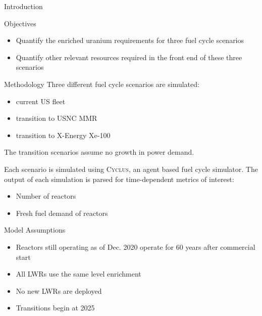 \documentclass[final]{beamer}
\newlength{\onecolwid}
\newlength{\threecolwid}
\newcommand{\Cyclus}{\textsc{Cyclus}\xspace}%
\begin{document}
\begin{frame}[t]
\begin{columns}[t,totalwidth=\threecolwid]
\begin{column}{\onecolwid}
\begin{block}{Introduction}
\end{block}

\begin{alertblock}{Objectives}
\begin{itemize}
    \item Quantify the enriched uranium requirements for three fuel cycle 
		  scenarios
	\item Quantify other relevant resources required in the front end of 
		  these three scenarios
\end{itemize}

\end{alertblock}

\begin{block}{Methodology}
Three different fuel cycle scenarios are simulated:
  \begin{itemize}
    \item current US fleet
    \item transition to \gls{USNC} \gls{MMR}
    \item transition to X-Energy Xe-100
  \end{itemize}
The transition scenarios assume no growth in power demand.


Each scenario is simulated using \Cyclus \cite{huff_fundamental_2016}, an agent 
based fuel cycle simulator. The output of each simulation is parsed for time-dependent 
metrics of interest:
  \begin{itemize}
    \item Number of reactors
    \item Fresh fuel demand of reactors
  \end{itemize}

  \begin{alertblock}{Model Assumptions}
  \begin{itemize}
      \item Reactors still operating as of Dec. 2020 operate
        for 60 years after commercial start 
    \item All \gls{LWR}s use the same level enrichment
    \item No new \gls{LWR}s are deployed
    \item Transitions begin at 2025
  \end{itemize}
  

\end{alertblock}
\end{block}
\end{column}
\end{columns}
\end{frame}
\end{document}

